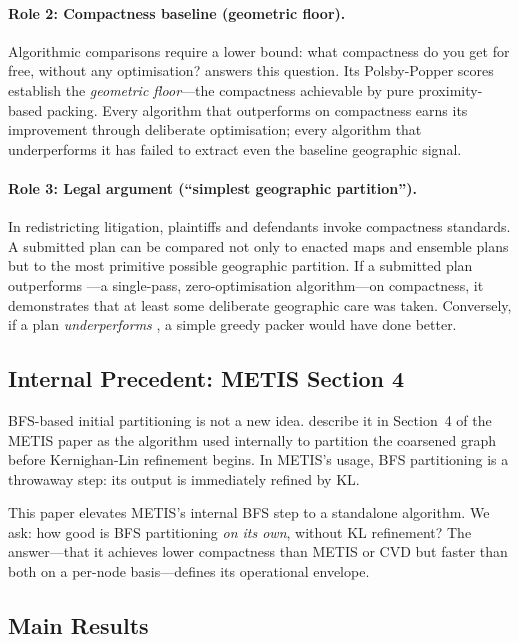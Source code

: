 \paragraph{Role 2: Compactness baseline (geometric floor).}
Algorithmic comparisons require a lower bound: what compactness do you
get for free, without any optimisation?
\bfsg{} answers this question.
Its Polsby-Popper scores establish the \emph{geometric floor}---the
compactness achievable by pure proximity-based packing.
Every algorithm that outperforms \bfsg{} on compactness earns its
improvement through deliberate optimisation; every algorithm that
underperforms it has failed to extract even the baseline geographic signal.

\paragraph{Role 3: Legal argument (``simplest geographic partition'').}
In redistricting litigation, plaintiffs and defendants invoke compactness
standards.
A submitted plan can be compared not only to enacted maps and ensemble
plans but to the most primitive possible geographic partition.
If a submitted plan outperforms \bfsg{}---a single-pass, zero-optimisation
algorithm---on compactness, it demonstrates that at least some deliberate
geographic care was taken.
Conversely, if a plan \emph{underperforms} \bfsg{}, a simple greedy packer
would have done better.

\subsection{Internal Precedent: METIS Section 4}

BFS-based initial partitioning is not a new idea.
\citet{karypis1998} describe it in Section~4 of the METIS paper as the
algorithm used internally to partition the coarsened graph before
Kernighan-Lin refinement begins.
In METIS's usage, BFS partitioning is a throwaway step: its output is
immediately refined by KL.

This paper elevates METIS's internal BFS step to a standalone algorithm.
We ask: how good is BFS partitioning \emph{on its own}, without KL
refinement?
The answer---that it achieves lower compactness than METIS or CVD but
faster than both on a per-node basis---defines its operational envelope.

\subsection{Main Results}


